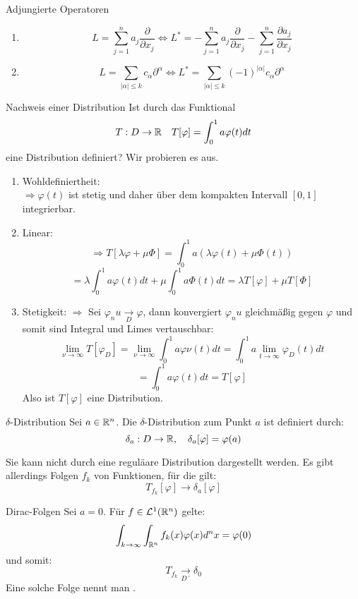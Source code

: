 \begin{Beispiel}{Adjungierte Operatoren}
\begin{enumerate}
    \item $$L=\sum_{j=1}^n a_j \frac{\partial}{\partial x_j} \iff L^*=-\sum_{j=1}^n a_j \frac{\partial}{\partial x_j}-\sum_{j=1}^n \frac{\partial a_j}{\partial x_j}$$
    \item $$L=\sum_{|\alpha|\leq k}c_\alpha\partial^\alpha \iff L^*=\sum_{|\alpha|\leq k}(-1)^{|\alpha|}c_\alpha\partial^\alpha$$
\end{enumerate}
\end{Beispiel}
\begin{Beispiel}{Nachweis einer Distribution}
    Ist durch das Funktional
    $$T:D\rightarrow \mathbb{R} \quad T[\varphi]=\int_0^1 a\varphi(t) dt$$
    eine Distribution definiert? Wir probieren es aus.
    \begin{enumerate}
        \item Wohldefiniertheit: \\
        $\Rightarrow \varphi(t)$ ist stetig und daher über dem kompakten Intervall $[0,1]$ integrierbar.
        \item Linear: \\
        $$\Rightarrow T[\lambda \varphi + \mu \Phi] = \int_0^1 a(\lambda \varphi(t)+\mu\Phi(t))$$
        $$=\lambda \int_0^1 a\varphi(t)dt + \mu\int_0^1 a\Phi(t) dt = \lambda T[\varphi] + \mu T[\Phi]$$
        \item Stetigkeit:
        $\Rightarrow$ Sei $\varphi_nu \underset{D}{\rightarrow}\varphi$, dann konvergiert $\varphi_nu$ gleichmäßig gegen $\varphi$ und somit sind Integral und Limes vertauschbar:
        $$\lim_{\nu \rightarrow \infty} T[\varphi_D]=\lim_{\nu \rightarrow \infty} \int_0^1 a \varphi\nu(t)dt = \int_0^1 a \lim_{t\rightarrow \infty} \varphi_D(t) dt$$
        $$=\int_0^1 a \varphi(t) dt = T[\varphi]$$
        Also ist $T[\varphi]$ eine Distribution.
    \end{enumerate}
\end{Beispiel}
\begin{Def}{$\delta$-Distribution}
    Sei $a\in \mathbb{R}^n$. Die $\delta$-Distribution zum Punkt $a$ ist definiert durch:
    $$\delta_a: D\rightarrow \mathbb{R}, \quad \delta_a[\varphi]=\varphi(a)$$
\end{Def}
Sie kann nicht durch eine reguläare Distribution dargestellt werden. Es gibt allerdings Folgen $f_k$ von Funktionen, für die gilt:
$$T_{f_k}[\varphi]\rightarrow \delta_a[\varphi]$$
\begin{Def}{Dirac-Folgen}
Sei $a=0$. Für $f\in \mathcal{L}^1(\mathbb{R}^n)$ gelte:
$$\int_{k\rightarrow \infty} \int_{\mathbb{R}^n} f_k(x)\varphi(x) d^n x = \varphi(0)$$
und somit:
$$T_{f_k}\underset{D´}{\rightarrow} \delta_0$$
    Eine solche Folge nennt man . 
\end{Def}
